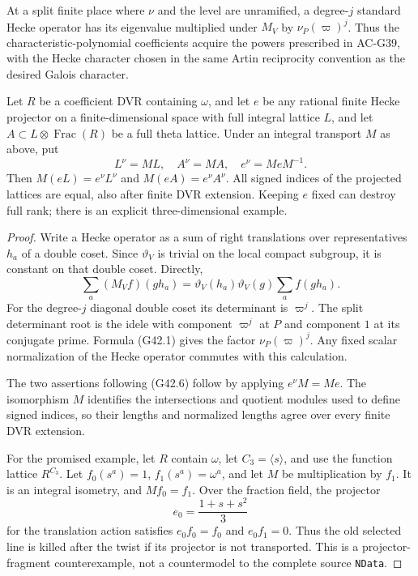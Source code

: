\begin{proposition}
\label{AC-G42-Hecke}
At a split finite place where $\nu$ and the level are
unramified, a degree-$j$ standard Hecke operator has
its eigenvalue multiplied under $M_V$ by
$\nu_P(\varpi)^j$.  Thus the characteristic-polynomial
coefficients acquire the powers prescribed in AC-G39,
with the Hecke character chosen in the same Artin
reciprocity convention as the desired Galois character.

Let $R$ be a coefficient DVR containing $\omega$,
and let $e$ be any rational finite Hecke projector on a
finite-dimensional space with full integral lattice
$L$, and let $A\subset L\otimes\operatorname{Frac}(R)$
be a full theta lattice.  Under an integral transport
$M$ as above, put
\[
 L^{\nu}=ML,\quad A^{\nu}=MA,\quad
                  e^{\nu}=MeM^{-1}.                    \tag{G42.6}
\]
Then $M(eL)=e^{\nu}L^{\nu}$ and
$M(eA)=e^{\nu}A^{\nu}$.  All signed indices of the
projected lattices are equal, also after finite DVR
extension.  Keeping $e$ fixed can destroy full rank;
there is an explicit three-dimensional example.
\end{proposition}
\begin{proof}
Write a Hecke operator as a sum of right translations
over representatives $h_a$ of a double coset.  Since
$\vartheta_V$ is trivial on the local compact subgroup,
it is constant on that double coset.  Directly,
\[
 \sum_a(M_Vf)(g h_a)
       =\vartheta_V(h_a)\vartheta_V(g)
                                    \sum_a f(g h_a).
\]
For the degree-$j$ diagonal double coset its determinant
is $\varpi^j$.  The split determinant root is the idele
with component $\varpi^j$ at $P$ and component $1$ at
its conjugate prime.  Formula (G42.1) gives the factor
$\nu_P(\varpi)^j$.  Any fixed scalar normalization of
the Hecke operator commutes with this calculation.

The two assertions following (G42.6) follow by applying
$e^{\nu}M=Me$.  The isomorphism $M$ identifies the
intersections and quotient modules used to define
signed indices, so their lengths and normalized
lengths agree over every finite DVR extension.

For the promised example, let $R$ contain $\omega$,
let $C_3=\langle s\rangle$, and use the function lattice
$R^{C_3}$.  Let $f_0(s^a)=1$, $f_1(s^a)=\omega^a$,
and let $M$ be multiplication by $f_1$.  It is an
integral isometry, and $Mf_0=f_1$.  Over the fraction
field, the projector
\[
              e_0=\frac{1+s+s^2}{3}
\]
for the translation action satisfies $e_0f_0=f_0$
and $e_0f_1=0$.  Thus the old selected line is killed
after the twist if its projector is not transported.
This is a projector-fragment counterexample, not a
countermodel to the complete source \texttt{NData}.
\end{proof}


